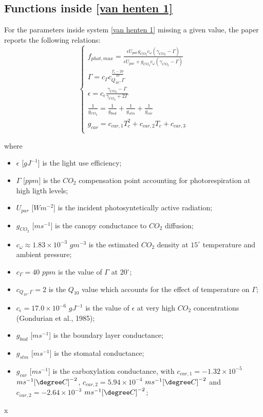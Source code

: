 \subsection{Functions inside \eqref{van henten 1}}
For the parameters inside system \eqref{van henten 1} missing a given value,
the paper reports the following relations:
\begin{equation} \label{van henten 2}
	\begin{cases}
		f_{phot,max} = \frac{\epsilon U_{par}g_{CO_2}c_\omega(\gamma_{CO_2}-\Gamma)}{\epsilon U_{par} + g_{CO_2}c_\omega(\gamma_{CO_2}-\Gamma)}\\
		\Gamma = c_\Gamma c_{Q_{10},\Gamma} ^{\frac{T_c-20}{10}}\\
		\epsilon = c_\epsilon \frac{\gamma_{CO_2}-\Gamma}{\gamma_{CO_2}+2\Gamma}\\
		\frac{1}{g_{CO_2}} = \frac{1}{g_{bnd}} + \frac{1}{g_{stm}} + \frac{1}{g_{car}}\\
		g_{car} = c_{car,1}T_c^2 + c_{car,2}T_c + c_{car,3}\\
	\end{cases}
\end{equation}
	
where
\begin{itemize}
	\item $\epsilon$ [$gJ^{-1}$] is the light use efficiency;
	\item $\Gamma$ [$ppm$] is the $CO_2$ compensation point accounting for photorespiration at high ligth levels;
	\item $U_{par}$ [$Wm^{-2}$] is the incident photosyntetically active radiation;
	\item $g_{CO_2}$ [$ms^{-1}$] is the canopy conductance to $CO_2$ diffusion;
	\item $c_\omega \approx{1.83\times10^{-3}}$ $gm^{-3}$ is the estimated $CO_2$ density at $15^\circ$ temperature and ambient pressure;
	\item $c_\Gamma=40$ $ppm$ is the value of $\Gamma$ at $20^\circ$;
	\item $c_{Q_{10},\Gamma} = 2$ is the $Q_{10}$ value which accounts for the effect of temperature on $\Gamma$;
	\item $c_\epsilon=17.0\times10^{-6}$ $gJ^{-1}$ is the value of $\epsilon$ at very high $CO_2$ concentrations (Gondurian et al., 1985);
	\item $g_{bnd}$ [$ms^{-1}$] is the boundary layer conductance;
	\item $g_{stm}$ [$ms^{-1}$] is the stomatal conductance;
	\item $g_{car}$ [$ms^{-1}$] is the carboxylation conductance, with $c_{car,1} = -1.32\times10^{-5}$ $ms^{-1} {[\degree C]}^{-2}$, $c_{car,2} = 5.94\times10^{-4}$ $ms^{-1} {[\degree C]}^{-2}$ and $c_{car,2} = -2.64\times10^{-3}$ $ms^{-1} {[\degree C]}^{-2}$;
\end{itemize}
	x
